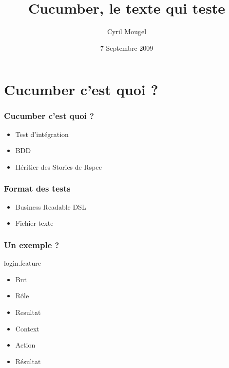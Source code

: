 \documentclass{beamer}
\title{Cucumber, le texte qui teste}
\author{Cyril Mougel}
\date{7 Septembre 2009}
\begin{document}
\begin{frame}
    \titlepage
\end{frame}

\section{Cucumber c'est quoi ?}

\begin{frame}
	\frametitle{Cucumber c'est quoi ?}
	\begin{itemize}
    \item Test d'intégration
    \item BDD
    \item Héritier des Stories de Rspec
	\end{itemize}
\end{frame}

\begin{frame}
  \frametitle{Format des tests}
  \begin{itemize}
    \item Business Readable DSL
    \item Fichier texte
  \end{itemize}
\end{frame}

\begin{frame}
  \frametitle{Un exemple ?}
  \begin{beamerboxesrounded}{login.feature}
    
  \end{beamerboxesrounded}
\end{frame}

\begin{frame}
  \begin{itemize}
    \item But
    \item Rôle
    \item Resultat
  \end{itemize}
\end{frame}

\begin{frame}
  \begin{itemize}
    \item Context
    \item Action
    \item R\'esultat
  \end{itemize}
\end{frame}
\end{document}
